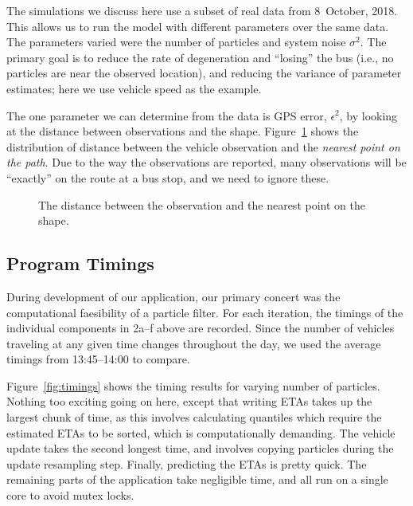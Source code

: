 The simulations we discuss here use a subset of real data from 8~October, 2018.
This allows us to run the model with different parameters over the same data.
The parameters varied were the number of particles and system noise $\sigma^2$.
The primary goal is to reduce the rate of degeneration and ``losing'' the bus 
(i.e., no particles are near the observed location),
and reducing the variance of parameter estimates; here we use vehicle speed as the example.


The one parameter we can determine from the data is GPS error, $\epsilon^2$,
by looking at the distance between observations and the shape.
Figure~\ref{fig:gps_dist} shows the distribution of distance between the vehicle
observation and the \emph{nearest point on the path}.
Due to the way the observations are reported, 
many observations will be ``exactly'' on the route at a bus stop,
and we need to ignore these.

\begin{figure}[tb]
    \centering
    \caption{The distance between the observation and the nearest point on the shape.}
    \label{fig:gps_dist}
\end{figure}



\subsection{Program Timings}
\label{sec:timings}

During development of our application,
our primary concert was the computational faesibility of a particle filter.
For each iteration, 
the timings of the individual components in 2a--f above are recorded.
Since the number of vehicles traveling at any given time changes throughout the day,
we used the average timings from 13:45--14:00 to compare.


Figure~\ref{fig:timings} shows the timing results for varying number of particles.
Nothing too exciting going on here, 
except that writing ETAs takes up the largest chunk of time,
as this involves calculating quantiles which require the estimated ETAs to be sorted,
which is computationally demanding. 
The vehicle update takes the second longest time,
and involves copying particles during the update resampling step.
Finally, predicting the ETAs is pretty quick.
The remaining parts of the application take negligible time,
and all run on a single core to avoid mutex locks.



